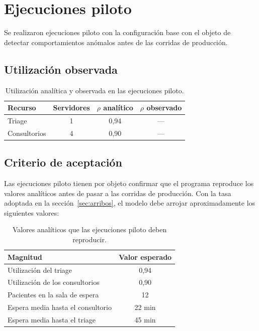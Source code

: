 \documentclass{article}
\begin{document}
\section{Ejecuciones piloto}
\label{sec:piloto}

Se realizaron ejecuciones piloto con la configuración base con el objeto de
detectar comportamientos anómalos antes de las corridas de producción.

\subsection{Utilización observada}

\begin{table}[H]
\centering
\begin{tabular}{lccc}
\toprule
\textbf{Recurso} & \textbf{Servidores} & \textbf{$\rho$ analítico} & \textbf{$\rho$ observado} \\
\midrule
Triage       & 1 & 0,94 & --- \\
Consultorios & 4 & 0,90 & --- \\
\bottomrule
\end{tabular}
\caption{Utilización analítica y observada en las ejecuciones piloto.}
\label{tab:piloto}
\end{table}

\subsection{Criterio de aceptación}

Las ejecuciones piloto tienen por objeto confirmar que el programa reproduce
los valores analíticos antes de pasar a las corridas de producción. Con la
tasa adoptada en la sección~\ref{sec:arribos}, el modelo debe arrojar
aproximadamente los siguientes valores:

\begin{table}[H]
\centering
\begin{tabular}{lc}
\toprule
\textbf{Magnitud} & \textbf{Valor esperado} \\
\midrule
Utilización del triage          & 0,94 \\
Utilización de los consultorios & 0,90 \\
Pacientes en la sala de espera  & 12 \\
Espera media hasta el consultorio & 22 min \\
Espera media hasta el triage      & 45 min \\
\bottomrule
\end{tabular}
\caption{Valores analíticos que las ejecuciones piloto deben reproducir.}
\label{tab:aceptacion}
\end{table}
\end{document}
